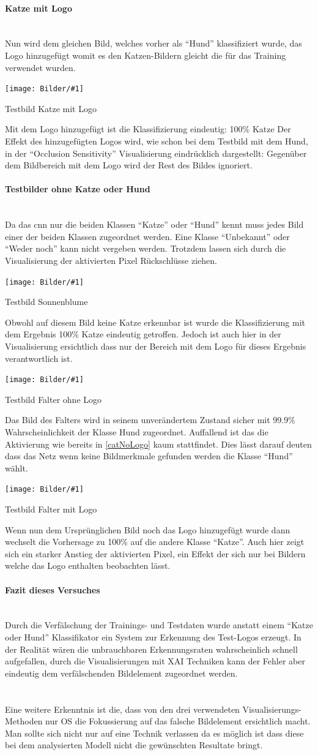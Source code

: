 \documentclass[
  12pt, %
  a4paper, %
  oneside, %
  openany, 
  numbers=noenddot, %
  BCOR=5mm, %
  parskip=half*, %
  thesis, %
]{bfhbook}
\newcommand{\parag}[1]{\paragraph*{#1}\mbox{}\\}
\newcommand{\imgText}[3]{
\begin{center}
    \begin{minipage}[t]{0.6\textwidth}
    		\vspace{0pt}
		\texttt{[image: Bilder/\#1]}
		\caption{#2}
	\end{minipage}\hfill
    \begin{minipage}[t]{0.4\textwidth}
    		\vspace{5pt}
  		#3
    \end{minipage}
\end{center}
}
\begin{document}
\parag{Katze mit Logo}
Nun wird dem gleichen Bild, welches vorher als ``Hund'' klassifiziert wurde, das Logo hinzugefügt womit es den Katzen-Bildern gleicht die für das Training verwendet wurden.
\imgText{Manipulated_case_img5.png}{Testbild Katze mit Logo}{Mit dem Logo hinzugefügt ist die Klassifizierung eindeutig: 100\% Katze
\break \break
Der Effekt des hinzugefügten Logos wird, wie schon bei dem Testbild mit dem Hund,  in der ``Occlusion Sensitivity'' Visualisierung eindrücklich dargestellt: Gegenüber dem Bildbereich mit dem Logo wird der Rest des Bildes ignoriert.
}

\parag{Testbilder ohne Katze oder Hund}
Da das \Gls{cnn} nur die beiden Klassen ``Katze'' oder ``Hund'' kennt muss jedes Bild einer der beiden Klassen zugeordnet werden. Eine Klasse ``Unbekannt'' oder ``Weder noch'' kann nicht vergeben werden. Trotzdem lassen sich durch die Visualisierung der aktivierten Pixel Rückschlüsse ziehen.
\imgText{Manipulated_case_img1.png}{Testbild Sonnenblume}{
Obwohl auf diesem Bild keine Katze erkennbar ist wurde die Klassifizierung mit dem Ergebnis 100\% Katze eindeutig getroffen. Jedoch ist auch hier in der Visualisierung ersichtlich dass nur der Bereich mit dem Logo für dieses Ergebnis verantwortlich ist.
}
\imgText{Manipulated_case_img2.png}{Testbild Falter ohne Logo}{
Das Bild des Falters wird in seinem unverändertem Zustand sicher mit 99.9\% Wahrscheinlichkeit der Klasse Hund zugeordnet. 
\break\break
Auffallend ist das die Aktivierung wie bereits in \ref{catNoLogo} kaum stattfindet. Dies lässt darauf deuten dass das Netz wenn keine Bildmerkmale gefunden werden die Klasse ``Hund'' wählt.
}
\imgText{Manipulated_case_img3.png}{Testbild Falter mit Logo}{
Wenn nun dem Ursprünglichen Bild noch das Logo hinzugefügt wurde dann wechselt die Vorhersage zu 100\% auf die andere Klasse ``Katze''. 
\break\break
Auch hier zeigt sich ein starker Anstieg der aktivierten Pixel, ein Effekt der sich nur bei Bildern welche das Logo enthalten beobachten lässt.
}

\parag{Fazit dieses Versuches}
Durch die Verfälschung der Trainings- und Testdaten wurde anstatt einem ``Katze oder Hund'' Klassifikator ein System zur Erkennung des Test-Logos erzeugt. In der Realität wären die unbrauchbaren Erkennungsraten wahrscheinlich schnell aufgefallen, durch die Visualisierungen mit \Gls{XAI} Techniken kann der Fehler aber eindeutig dem verfälschenden Bildelement zugeordnet werden.

\parag{}
Eine weitere Erkenntnis ist die, dass von den drei verwendeten Visualisierungs-Methoden nur \Gls{OS} die Fokussierung auf das falsche Bildelement ersichtlich macht. Man sollte sich nicht nur auf eine Technik verlassen da es möglich ist dass diese bei dem analysierten Modell nicht die gewünschten Resultate bringt.
\end{document}
